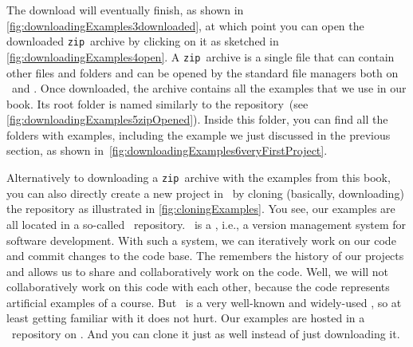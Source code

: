 %
The download will eventually finish, as shown in \cref{fig:downloadingExamples3downloaded}, at which point you can open the downloaded \texttt{zip}~archive by clicking on it as sketched in \cref{fig:downloadingExamples4open}.
A \texttt{zip}~archive is a single file that can contain other files and folders and can be opened by the standard file managers both on \ubuntu\ and \microsoftWindows.
Once downloaded, the archive contains all the examples that we use in our book.
Its root folder is named similarly to the repository~(see \cref{fig:downloadingExamples5zipOpened}).
Inside this folder, you can find all the folders with examples, including the example  we just discussed in the previous section, as shown in~\cref{fig:downloadingExamples6veryFirstProject}.

Alternatively to downloading a \texttt{zip}~archive with the examples from this book, you can also directly create a new project in \pycharm\ by cloning (basically, downloading) the repository as illustrated in \cref{fig:cloningExamples}.
You see, our examples are all located in a so-called \git\ repository.
\git\ is a , i.e., a version management system for software development.
With such a system, we can iteratively work on our code and commit changes to the code base.
The  remembers the history of our projects and allows us to share and collaboratively work on the code.
Well, we will not collaboratively work on this code with each other, because the code represents artificial examples of a course.
But \git\ is a very well-known and widely-used , so at least getting familiar with it does not hurt.
Our examples are hosted in a \git\ repository on \github{}.
And you can clone it just as well instead of just downloading it.

